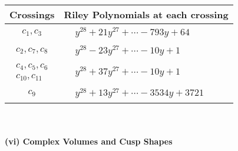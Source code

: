 \documentclass[1p]{elsarticle_modified}
\theoremstyle{definition}
\begin{document}
\begin{tabular}{m{50pt}|m{274pt}}
Crossings & \hspace{64pt}Riley Polynomials at each crossing \\
\hline $$\begin{aligned}c_{1},c_{3}\end{aligned}$$&$\begin{aligned}
&y^{28}+21 y^{27}+\cdots-793 y+64
\end{aligned}$\\
\hline $$\begin{aligned}c_{2},c_{7},c_{8}\end{aligned}$$&$\begin{aligned}
&y^{28}-23 y^{27}+\cdots-10 y+1
\end{aligned}$\\
\hline $$\begin{aligned}c_{4},c_{5},c_{6}\\c_{10},c_{11}\end{aligned}$$&$\begin{aligned}
&y^{28}+37 y^{27}+\cdots-10 y+1
\end{aligned}$\\
\hline $$\begin{aligned}c_{9}\end{aligned}$$&$\begin{aligned}
&y^{28}+13 y^{27}+\cdots-3534 y+3721
\end{aligned}$\\
\hline
\end{tabular}\\~\\
\newpage\flushleft \textbf{(vi) Complex Volumes and Cusp Shapes}
\end{document}
